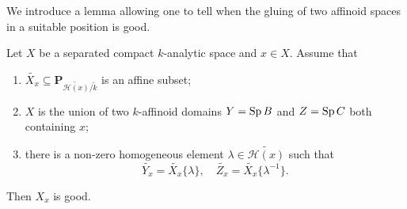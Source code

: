 We introduce a lemma allowing one to tell when the gluing of two affinoid spaces in a suitable position is good.
\begin{lemma}\label{lma-glueaffinetogood}
    Let $X$ be a separated compact $k$-analytic space and $x\in X$. Assume that
    \begin{enumerate}
        \item $\widetilde{X_x}\subseteq \mathbf{P}_{\widetilde{\mathscr{H}(x)}/\tilde{k}}$ is an affine subset;
        \item $X$ is the union of two $k$-affinoid domains $Y=\operatorname{Sp} B$ and $Z=\operatorname{Sp} C$ both containing $x$;
        \item there is a non-zero homogeneous element $\lambda\in \widetilde{\mathscr{H}(x)}$ such that
        \[
            \widetilde{Y_x}=\widetilde{X_x}\{\lambda\},\quad   \widetilde{Z_x}=\widetilde{X_x}\{\lambda^{-1}\}.
        \]
    \end{enumerate}
    Then $X_x$ is good.
\end{lemma}
